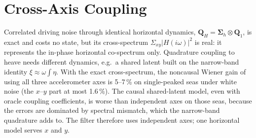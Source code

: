 \documentclass[conference]{IEEEtran}
\DeclareRobustCommand{\mat}[1]{\bm{#1}}
\theoremstyle{bodysmall}
\begin{document}
\section{Cross-Axis Coupling}
\label{sec:coupling}
Correlated driving noise through identical horizontal dynamics,
$\mat{Q}_H=\mat{\Sigma}_h\otimes\mat{Q}_1$, is exact and costs no state, but
its cross-spectrum $\Sigma_{xy}|H(i\omega)|^2$ is real: it represents the
in-phase horizontal co-spectrum only. Quadrature coupling to heave needs
different dynamics, e.g.\ a shared latent built on the narrow-band identity
$\xi\approx\omega\int\eta$. With the exact cross-spectrum, the noncausal
Wiener gain of using all three accelerometer axes is 5--7\,\% on
single-peaked seas under white noise (the $x$--$y$ part at most 1.6\,\%).
The causal shared-latent model, even with oracle coupling coefficients, is
worse than independent axes on those seas, because the errors are dominated
by spectral mismatch, which the narrow-band quadrature adds to. The filter
therefore uses independent axes; one horizontal model serves $x$ and $y$.
\end{document}
